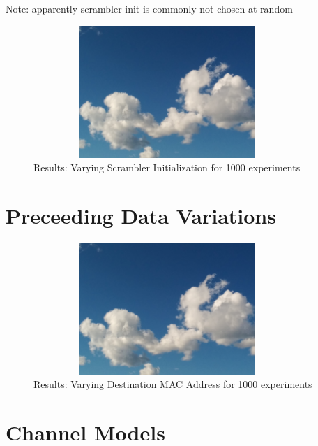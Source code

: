 Note: apparently scrambler init is commonly not chosen at random \cite{NEEDED}

\begin{figure}[H]
	\centering
	\includegraphics[width=0.9\textwidth,height=5cm]{gfx/images/stock-clouds}
	\caption{Results: Varying Scrambler Initialization for 1000 experiments}
	\label{fig:vary_scrambler}
\end{figure}



\section{Preceeding Data Variations}

\begin{figure}[H]
	\centering
	\includegraphics[width=0.9\textwidth,height=5cm]{gfx/images/stock-clouds}
	\caption{Results: Varying Destination MAC Address for 1000 experiments}
	\label{fig:vary_dest}
\end{figure}



\section{Channel Models}

